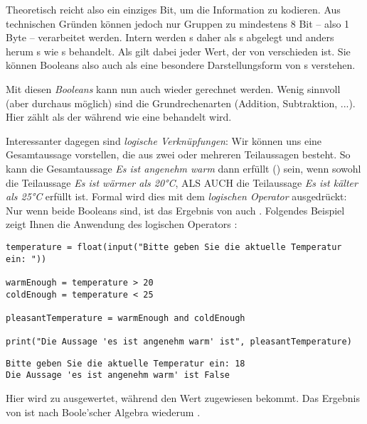 Theoretisch reicht also ein einziges Bit, um die Information  zu kodieren. Aus technischen Gründen können jedoch nur Gruppen zu mindestens 8 Bit -- also 1 Byte -- verarbeitet werden. Intern werden s daher als s abgelegt und anders herum s wie s behandelt. Als  gilt dabei jeder Wert, der von  verschieden ist. Sie können Booleans also auch als eine besondere Darstellungsform von s verstehen.

Mit diesen \emph{Booleans} kann nun auch wieder gerechnet werden. Wenig sinnvoll (aber durchaus möglich) sind die Grundrechenarten (Addition, Subtraktion, ...). Hier zählt  als der  während  wie eine  behandelt wird.

Interessanter dagegen sind \emph{logische Verknüpfungen}: Wir können uns eine Gesamtaussage vorstellen, die aus zwei oder mehreren Teilaussagen besteht. So kann die Gesamtaussage \emph{Es ist angenehm warm} dann erfüllt () sein, wenn sowohl die Teilaussage \emph{Es ist wärmer als 20°C}, ALS AUCH die Teilaussage \emph{Es ist kälter als 25°C} erfüllt ist. Formal wird dies mit dem \emph{logischen Operator}  ausgedrückt: Nur wenn beide Booleans  sind, ist das Ergebnis von  auch . Folgendes Beispiel zeigt Ihnen die Anwendung des logischen Operators :

\begin{codebox}
\begin{verbatim}
temperature = float(input("Bitte geben Sie die aktuelle Temperatur ein: "))

warmEnough = temperature > 20
coldEnough = temperature < 25

pleasantTemperature = warmEnough and coldEnough

print("Die Aussage 'es ist angenehm warm' ist", pleasantTemperature)
\end{verbatim}
\end{codebox}

\begin{cmdbox}
\begin{verbatim}
Bitte geben Sie die aktuelle Temperatur ein: 18
Die Aussage 'es ist angenehm warm' ist False
\end{verbatim}
\end{cmdbox}

Hier wird  zu  ausgewertet, während  den Wert  zugewiesen bekommt. Das Ergebnis von  ist nach Boole'scher Algebra wiederum .

